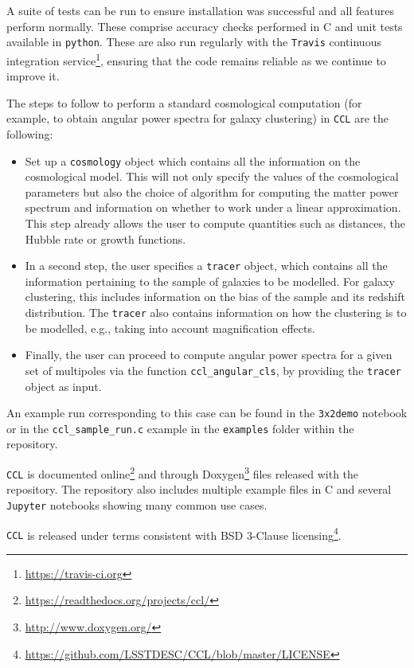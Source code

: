 \documentclass[\docopts]{\docclass}
\newcommand{\ccl}{{\tt CCL}\xspace}
\begin{document}
A suite of tests can be run to ensure installation was successful and all features perform normally. These comprise accuracy checks performed in C and unit tests available in {\tt python}. These are also run regularly with the {\tt Travis} continuous integration service\footnote{\url{https://travis-ci.org}}, ensuring that the code remains reliable as we continue to improve it. 

The steps to follow to perform a standard cosmological computation (for example, to obtain angular power spectra for galaxy clustering) in \ccl are the following:
\begin{itemize}
\item Set up a {\tt cosmology} object which contains all the information on the cosmological model. This will not only specify the values of the cosmological parameters but also the choice of algorithm for computing the matter power spectrum and information on whether to work under a linear approximation. This step already allows the user to compute quantities such as distances, the Hubble rate or growth functions.
\item In a second step, the user specifies a {\tt tracer} object, which contains all the information pertaining to the sample of galaxies to be modelled. For galaxy clustering, this includes information on the bias of the sample and its redshift distribution. The {\tt tracer} also contains information on how the clustering is to be modelled, e.g., taking into account magnification effects. 
\item Finally, the user can proceed to compute angular power spectra for a given set of multipoles via the function {\tt ccl\_angular\_cls}, by providing the {\tt tracer} object as input.
\end{itemize}
An example run corresponding to this case can be found in the {\tt 3x2demo} notebook or in the {\tt ccl\_sample\_run.c} example in the {\tt examples} folder within the repository.

\ccl is documented online\footnote{\url{https://readthedocs.org/projects/ccl/}} and through Doxygen\footnote{\url{http://www.doxygen.org/}} files released with the repository. The repository also includes multiple example files in C and several {\tt Jupyter} notebooks showing many common use cases.

\ccl is released under terms consistent with BSD 3-Clause licensing\footnote{\url{https://github.com/LSSTDESC/CCL/blob/master/LICENSE}}.

\end{document}
